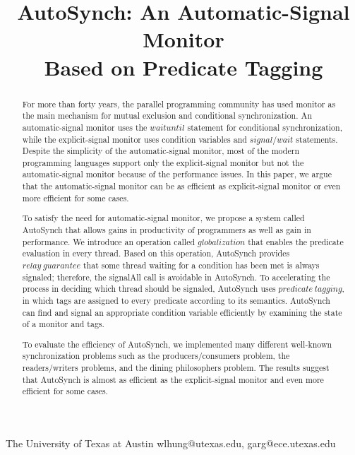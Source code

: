 \documentclass[preprint]{sigplanconf}
\begin{document}
\copyrightdata{[to be supplied]} 


\title{AutoSynch: An Automatic-Signal Monitor \\ Based on Predicate Tagging}
\subtitle{}

           {The University of Texas at Austin}
           {wlhung@utexas.edu, garg@ece.utexas.edu}

\maketitle

\begin{abstract}
For more than forty years, the parallel programming community has used monitor 
as the main mechanism for mutual exclusion and conditional synchronization. An 
automatic-signal monitor uses the $waituntil$ statement for conditional 
synchronization, while the explicit-signal monitor uses condition variables and 
$signal/wait$ statements. Despite the simplicity of the automatic-signal monitor, 
most of the modern programming languages support only the explicit-signal 
monitor but not the automatic-signal monitor because of the performance issues. 
In this paper, we argue that the automatic-signal monitor can be as efficient 
as explicit-signal monitor or even more efficient for some cases.

To satisfy the need for automatic-signal monitor, we propose a system called 
AutoSynch that allows gains in productivity of 
programmers as well as gain in performance. We introduce an operation called
$globalization$ that enables the predicate evaluation in
every thread. Based on this operation, AutoSynch provides $relay\ guarantee$
that some thread waiting for a condition has been met is always signaled; 
therefore, the signalAll call is avoidable in AutoSynch. To accelerating the 
process in
deciding which thread should be signaled, AutoSynch uses 
$predicate\ tagging$, in which tags are assigned to every predicate according
to its semantics. AutoSynch can find and signal an appropriate condition 
variable efficiently by examining the state of a monitor and tags. 

To evaluate the efficiency of AutoSynch, we implemented many different 
well-known synchronization problems such as the producers/consumers problem,
the readers/writers problems, and the dining philosophers problem. The results
suggest that AutoSynch is almost as efficient as the explicit-signal monitor
and even more efficient for some cases. 

\end{abstract}
\end{document}
